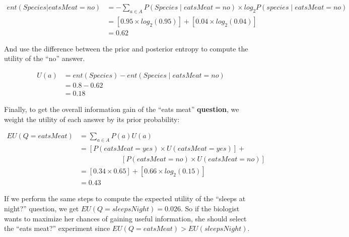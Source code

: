 \documentclass[english,floatsintext,man]{apa6}
\theoremstyle{definition}
\theoremstyle{definition}
\theoremstyle{definition}
\theoremstyle{remark}
\begin{document}
\[ 
\begin{aligned}
ent(Species|eatsMeat = no) &= -\sum_{a\in A}{P(Species \mid eatsMeat = no) \times log_2P(species \mid eatsMeat = no)}\\
&= [0.95 \times log_2(0.95)] + [0.04 \times log_2(0.04)]\\
&=  0.62
\end{aligned}
\]

\noindent
And use the difference between the prior and posterior entropy to
compute the utility of the \enquote{no} answer.

\[ 
\begin{aligned}
U(a) &= ent(Species) - ent(Species \mid eatsMeat = no)\\
&= 0.8 - 0.62 \\
&= 0.18
\end{aligned}
\]

\noindent
Finally, to get the overall information gain of the \enquote{eats meat}
\textbf{question}, we weight the utility of each answer by its prior
probability:

\[
\begin{aligned}
EU(Q = eatsMeat) &= \sum_{a\in A}{P(a)U(a)} \\
&= [P(eatsMeat = yes) \times U(eatsMeat = yes)] + \\& \qquad \qquad \qquad [P(eatsMeat = no) \times U(eatsMeat = no)]\\
&= [0.34 \times 0.65] + [0.66 \times log_2(0.15)]\\
&= 0.43
\end{aligned}
\]

If we perform the same steps to compute the expected utility of the
\enquote{sleeps at night?} question, we get
\(EU(Q = sleepsNight) = 0.026\). So if the biologist wants to maximize
her chances of gaining useful information, she should select the
\enquote{eats meat?} experiment since
\(EU(Q = eatsMeat) > EU(sleepsNight)\).
\end{document}

